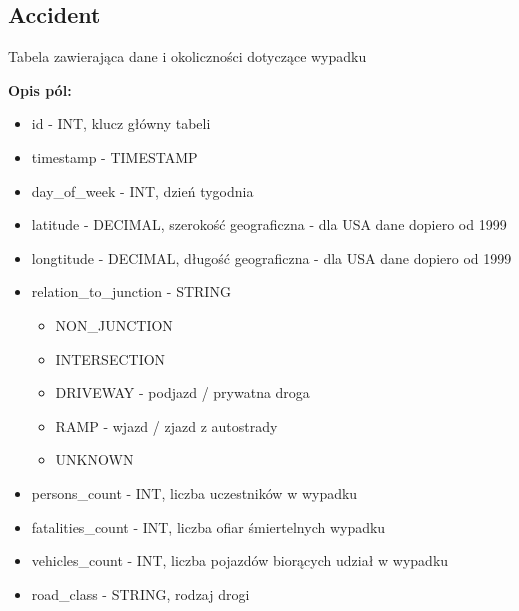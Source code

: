 \subsection{Accident}\label{accident}

Tabela zawierająca dane i okoliczności dotyczące wypadku

\textbf{Opis pól:}

\begin{itemize}
\item
  id - INT, klucz główny tabeli\\
\item
  timestamp - TIMESTAMP\\
\item
  day\_of\_week - INT, dzień tygodnia\\
\item
  latitude - DECIMAL, szerokość geograficzna - dla USA dane dopiero od
  1999\\
\item
  longtitude - DECIMAL, długość geograficzna - dla USA dane dopiero od
  1999\\
\item
  relation\_to\_junction - STRING

  \begin{itemize}
  \itemsep-14pt\parskip0pt
  \item
    NON\_JUNCTION\\
  \item
    INTERSECTION\\
  \item
    DRIVEWAY - podjazd / prywatna droga\\
  \item
    RAMP - wjazd / zjazd z autostrady\\
  \item
    UNKNOWN\\
  \end{itemize}
\item
  persons\_count - INT, liczba uczestników w wypadku\\
\item
  fatalities\_count - INT, liczba ofiar śmiertelnych wypadku\\
\item
  vehicles\_count - INT, liczba pojazdów biorących udział w wypadku\\
\item
  road\_class - STRING, rodzaj drogi


\end{itemize}
